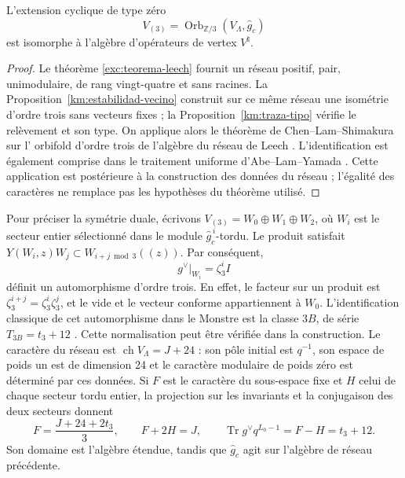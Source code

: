 \begin{theorem}
\label{km:moonshine-tres}
L'extension cyclique de type zéro
\begin{equation}
 V_{(3)}=\operatorname{Orb}_{\mathbb Z/3}
                 (V_\Lambda,\widehat g_c)
 \label{km:extension-orden3}
\end{equation}
est isomorphe à l'algèbre d'opérateurs de vertex \(V^\natural\).
\end{theorem}
\begin{proof}
Le théorème \ref{exc:teorema-leech} fournit un réseau positif,
pair, unimodulaire, de rang vingt-quatre et sans racines. La
Proposition~\ref{km:estabilidad-vecino} construit sur ce même
réseau une isométrie d'ordre trois sans vecteurs fixes ; la
Proposition~\ref{km:traza-tipo} vérifie le relèvement et son type.
On applique alors le théorème de Chen--Lam--Shimakura sur l'
orbifold d'ordre trois de l'algèbre du réseau de Leech
\cite[Teorema~1.1]{chenlamshimakura2016}. L'identification est également comprise
dans le traitement uniforme d'Abe--Lam--Yamada
\cite[Teorema~4.4 y secciones~2--4]{abelamyamada2017}. Cette application est postérieure à la construction
des données du réseau ; l'égalité des caractères ne remplace pas les
hypothèses du théorème utilisé.
\end{proof}

Pour préciser la symétrie duale, écrivons \(V_{(3)}=W_0\oplus W_1\oplus W_2\), où \(W_i\) est le secteur entier sélectionné dans le module \(\widehat g_c^{\,i}\)-tordu. Le produit satisfait \(Y(W_i,z)W_j\subset W_{i+j\bmod3}((z))\). Par conséquent,
\begin{equation}
 g^\vee|_{W_i}=\zeta_3^i I
 \label{km:dual-ciclico}
\end{equation}
définit un automorphisme d'ordre trois. En effet, le facteur sur un
produit est \(\zeta_3^{i+j}=\zeta_3^i\zeta_3^j\), et le vide et le
vecteur conforme appartiennent à \(W_0\). L'identification classique de
cet automorphisme dans le Monstre est la classe \(3B\), de série
\(T_{3B}=t_3+12\) \cite{kmconwaynorton1979,borcherds}.
Cette normalisation peut être vérifiée dans la construction. Le caractère
du réseau est \(\operatorname{ch}V_\Lambda=J+24\) : son pôle initial
est \(q^{-1}\), son espace de poids un est de dimension 24 et le
caractère modulaire de poids zéro est déterminé par ces données.
Si \(F\) est le caractère du sous-espace fixe et \(H\) celui de chaque
secteur tordu entier, la projection sur les invariants et la conjugaison
des deux secteurs donnent
\[
 F=\frac{J+24+2t_3}{3},\qquad F+2H=J,
 \qquad \operatorname{Tr}g^\vee q^{L_0-1}=F-H=t_3+12.
\]
Son domaine est l'algèbre étendue, tandis que \(\widehat g_c\) agit sur l'algèbre de réseau précédente.

